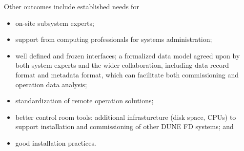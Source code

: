 Other outcomes include established needs for 
\begin{itemize}
\item on-site
subsystem experts; 
\item support from computing professionals
for systems administration; 
\item well defined and frozen interfaces;
a formalized data model agreed upon by both system experts and the wider
collaboration, including data record format and metadata format, which can facilitate both commissioning and operation
data analysis; 
\item standardization of remote  operation solutions;
\item better control room tools; additional  infrasturcture (disk
space, CPUs) to support installation and commissioning of other DUNE
FD systems; and 
\item good
installation practices.
\end{itemize}






